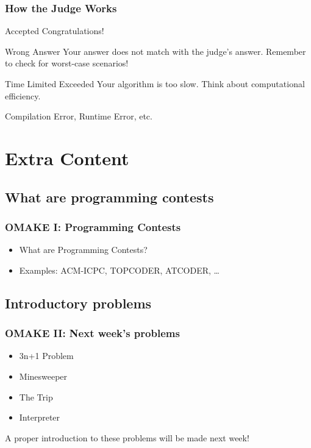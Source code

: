 \documentclass{beamer}
\begin{document}
\begin{frame}
  \frametitle{How the Judge Works}
  \begin{block}{Accepted}
    Congratulations!
  \end{block}
  \begin{block}{\alert{Wrong Answer}}
    Your answer does not match with the judge's answer. Remember to
    check for worst-case scenarios!
  \end{block}
  \begin{block}{\alert{Time Limited Exceeded}}
    Your algorithm is too slow. Think about computational efficiency.
  \end{block}
  \begin{block}{}
    Compilation Error, Runtime Error, etc.
  \end{block}
\end{frame}

\section{Extra Content}

\subsection{What are programming contests}
\begin{frame}
  \frametitle{OMAKE I: Programming Contests}

  \begin{itemize}
    \item What are Programming Contests?
    \item Examples: ACM-ICPC, TOPCODER, ATCODER, \ldots
  \end{itemize}
\end{frame}

\subsection{Introductory problems}
\begin{frame}
  \frametitle{OMAKE II: Next week's problems}
  \begin{itemize}
  \item 3n+1 Problem
  \item Minesweeper
  \item The Trip
  \item Interpreter
  \end{itemize}
  
  \begin{block}{}
    A proper introduction to these problems will be made next week!
  \end{block}

\end{frame}
\end{document}
